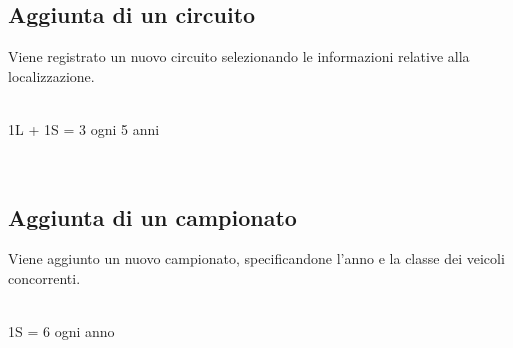 \documentclass[a4paper,12pt]{report}
\begin{document}
			\subsection{Aggiunta di un circuito}
			{\fontsize{12.5}{20}\selectfont
			Viene registrato un nuovo circuito selezionando le informazioni relative alla localizzazione.}
			\begin{table}[!htb]
				\centering
				\begin{center}
				\newline\\
				1L + 1S = 3 ogni 5 anni\\
				\end{center}
			\end{table}\\
			\subsection{Aggiunta di un campionato}
			{\fontsize{12.5}{20}\selectfont
			Viene aggiunto un nuovo campionato, specificandone l'anno e la classe dei veicoli concorrenti.}
			\begin{table}[!htb]
				\centering
				\begin{center}
				\newline\\
				1S = 6 ogni anno\\
				\end{center}
			\end{table}\\
\end{document}

